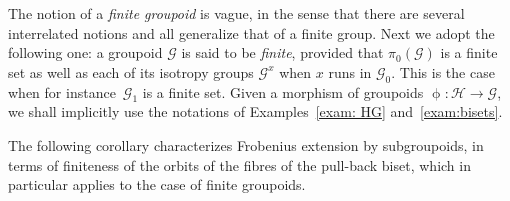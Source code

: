 \documentclass[pdftex]{sigma}
\numberwithin{equation}{section}
\newcommand{\Go}{\cG_{\Sscript{0}}}
\newcommand{\Ga}{\cG_{\Sscript{1}}}
\newcommand{\cG}{{\mathcal G}}
\newcommand{\cH}{{\mathcal H}}
\newcommand{\Sscript}[1]{\scriptscriptstyle{#1}}
\begin{document}
\smallskip

The notion of a \emph{finite groupoid} is vague, in the sense that there are several interrelated notions and all generalize that of a finite group. Next we adopt the following one: a groupoid $\cG$ is said to be \emph{finite}, provided that $\pi_{0}(\cG)$ is a finite set as well as each of its isotropy groups $\cG^{\Sscript{x}}$ when $x$ runs in $\Go$. This is the case when for instance~$\Ga$ is a finite set. Given a morphism of groupoids $\upphi\colon \cH \to \cG$, we shall implicitly use the notations of Examples~\ref{exam: HG} and~\ref{exam:bisets}.

The following corollary characterizes Frobenius extension by subgroupoids, in terms of finiteness of the orbits of the fibres of the pull-back biset, which in particular applies to the case of
finite groupoids.
\end{document}
